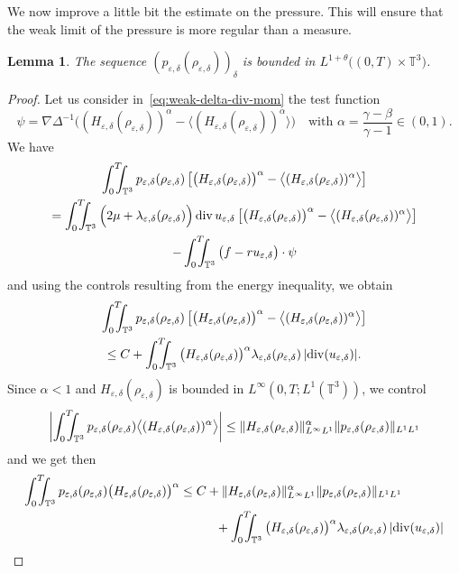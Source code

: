 \documentclass[JEP,XML,SOM,Unicode,NoEqCountersInSection]{cedram}
\newcommand{\<}{\bigl\langle}
\renewcommand{\>}{\bigr\rangle}
\newcommand{\intTTT}{\int_0^T\hspace*{-2.5mm}\int_{\TT}}
\newtheorem{lem}[thm]{Lemma}
\theoremstyle{definition}
\theoremstyle{remark}
\newcommand{\TT}{\mathbb{T}^3}
\DeclareMathOperator{\Div}{div}
\let\ep\varepsilon
\begin{document}
We now improve a little bit the estimate on the pressure.
This will ensure that the weak limit of the pressure is more regular than a measure.
\begin{lem}{\label{lem:estim-pressure}}
The sequence $(p_{\ep,\delta}(\rho_{\ep,\delta}))_\delta$ is bounded in $L^{1+\theta}\big((0,T)\times \TT \big)$.
\end{lem}
\begin{proof}
Let us consider in~\eqref{eq:weak-delta-div-mom} the test function
\[
\psi = \nabla \Delta^{-1}\big((H_{\ep,\delta}(\rho_{\ep,\delta}))^\alpha - \<(H_{\ep,\delta}(\rho_{\ep,\delta}))^\alpha\> \big) \quad \text{with } \alpha = \dfrac{\gamma - \beta}{\gamma-1} \in (0,1).
\]
We have
\begin{multline*}
\intTTT{p_{\ep,\delta}(\rho_{\ep,\delta}) \left[\big(H_{\ep,\delta}(\rho_{\ep,\delta}) \big)^{\alpha} - \<(H_{\ep,\delta}(\rho_{\ep,\delta}))^\alpha\> \right] } \\
= \intTTT{\Big(2\mu + \lambda_{\ep,\delta}(\rho_{\ep,\delta})\Big)\Div u_{\ep,\delta} \left[\big(H_{\ep,\delta}(\rho_{\ep,\delta}) \big)^{\alpha} - \<(H_{\ep,\delta}(\rho_{\ep,\delta}))^\alpha\> \right]} \\
- \intTTT{\big(f-ru_{\ep,\delta}\big) \cdot \psi }
\end{multline*}
and using the controls resulting from the energy inequality, we obtain
\begin{multline*}
\intTTT{p_{\ep,\delta}(\rho_{\ep,\delta}) \left[\big(H_{\ep,\delta}(\rho_{\ep,\delta}) \big)^{\alpha} - \<(H_{\ep,\delta}(\rho_{\ep,\delta}))^\alpha\> \right] } \\
\leq C + \intTTT{\big(H_{\ep,\delta}(\rho_{\ep,\delta}) \big)^{\alpha}\lambda_{\ep,\delta}(\rho_{\ep,\delta})\,|{\Div(u_{\ep,\delta})}| }.
\end{multline*}
Since $\alpha < 1$ and $H_{\ep,\delta}(\rho_{\ep,\delta})$ is bounded in $L^\infty(0,T;L^1(\TT))$,
we control
\[
\biggl|\intTTT{p_{\ep,\delta}(\rho_{\ep,\delta}) \<(H_{\ep,\delta}(\rho_{\ep,\delta}))^\alpha\> }\biggr|
\leq \|H_{\ep,\delta}(\rho_{\ep,\delta})\|_{L^\infty L^1}^{\alpha} \|p_{\ep,\delta}(\rho_{\ep,\delta})\|_{L^1L^1}
\]
and we get then
\begin{align*}
\intTTT{p_{\ep,\delta}(\rho_{\ep,\delta}) \big(H_{\ep,\delta}(\rho_{\ep,\delta}) \big)^{\alpha}}
& \leq C + \|H_{\ep,\delta}(\rho_{\ep,\delta})\|_{L^\infty L^1}^{\alpha} \|p_{\ep,\delta}(\rho_{\ep,\delta})\|_{L^1L^1} \\
& \hspace*{1cm} + \intTTT{\big(H_{\ep,\delta}(\rho_{\ep,\delta}) \big)^{\alpha}\lambda_{\ep,\delta}(\rho_{\ep,\delta})\,|{\Div(u_{\ep,\delta})}| } \\

\end{align*}
\end{proof}
\end{document}
